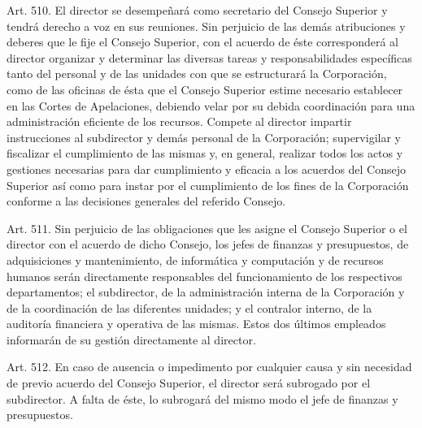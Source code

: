     Art. 510. El director se desempeñará como secretario del Consejo Superior y tendrá derecho a voz en sus reuniones.
    Sin perjuicio de las demás atribuciones y deberes que le fije el Consejo Superior, con el acuerdo de éste corresponderá al director organizar y determinar las diversas tareas y responsabilidades específicas tanto del personal y de las unidades con que se estructurará la Corporación, como de las oficinas de ésta que el Consejo Superior estime necesario establecer en las Cortes de Apelaciones, debiendo velar por su debida coordinación para una administración eficiente de los recursos.
    Compete al director impartir instrucciones al subdirector y demás personal de la Corporación; supervigilar y fiscalizar el cumplimiento de las mismas y, en general, realizar todos los actos y gestiones necesarias para dar cumplimiento y eficacia a los acuerdos del Consejo Superior así como para instar por el cumplimiento de los fines de la Corporación conforme a las decisiones generales del referido Consejo.


    Art. 511. Sin perjuicio de las obligaciones que les asigne el Consejo Superior o el director con el acuerdo de dicho Consejo, los jefes de finanzas y presupuestos, de adquisiciones y mantenimiento, de informática y computación y de recursos humanos serán directamente responsables del funcionamiento de los respectivos departamentos; el subdirector, de la administración interna de la Corporación y de la coordinación de las diferentes unidades; y el contralor interno, de la auditoría financiera y operativa de las mismas. Estos dos últimos empleados informarán de su gestión directamente al director.



    Art. 512. En caso de ausencia o impedimento por cualquier causa y sin necesidad de previo acuerdo del Consejo Superior, el director será subrogado por el subdirector. A falta de éste, lo subrogará del mismo modo el jefe de finanzas y presupuestos.



